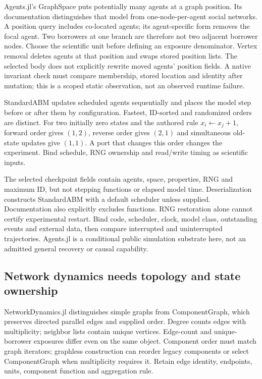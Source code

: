 Agents.jl's GraphSpace puts potentially many agents at a graph position. Its
documentation distinguishes that model from one-node-per-agent social
networks. A position query includes co-located agents; its agent-specific form
removes the focal agent. Two borrowers at one branch are therefore not two
adjacent borrower nodes. Choose the scientific unit before defining an exposure
denominator. Vertex removal deletes agents at that position and swaps stored
position lists. The selected body does not explicitly rewrite moved agents'
position fields. A native invariant check must compare membership, stored
location and identity after mutation; this is a scoped static observation,
not an observed runtime failure.~\citep{exec25_onet_agents,exec25_onet_choice}

StandardABM updates scheduled agents sequentially and places the model step
before or after them by configuration. Fastest, ID-sorted and randomized
orders are distinct. For two initially zero states and the authored rule
$x_i\leftarrow x_j+1$, forward order gives $(1,2)$, reverse order gives
$(2,1)$ and simultaneous old-state updates give $(1,1)$. A port that changes
this order changes the experiment. Bind schedule, RNG ownership and read/write
timing as scientific inputs.~\citep{exec25_onet_agents,exec25_onet_choice}

The selected checkpoint fields contain agents, space, properties, RNG and
maximum ID, but not stepping functions or elapsed model time. Deserialization
constructs StandardABM with a default scheduler unless supplied. Documentation
also explicitly excludes functions. RNG restoration alone cannot certify
experimental restart. Bind code, scheduler, clock, model class, outstanding
events and external data, then compare interrupted and uninterrupted
trajectories. Agents.jl is a conditional public simulation substrate here,
not an admitted general recovery or causal capability.
\citep{exec25_onet_agents,exec25_onet_choice}

\subsection{Network dynamics needs topology and state ownership}

NetworkDynamics.jl distinguishes simple graphs from ComponentGraph, which
preserves directed parallel edges and supplied order. Degree counts edges
with multiplicity; neighbor lists contain unique vertices. Edge-count and
unique-borrower exposures differ even on the same object. Component order
must match graph iterators; graphless construction can reorder legacy
components or select ComponentGraph when multiplicity requires it. Retain
edge identity, endpoints, units, component function and aggregation rule.
\citep{exec25_onet_dynamics}

